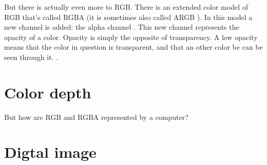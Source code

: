 But there is actually even more to RGB. There is an extended color
model of RGB that's called RGBA (it is sometimes also
called ARGB ). In this model a new channel is added: the
alpha channel . This new channel represents the
opacity of a color. Opacity is simply the opposite of transparency.  A
low opacity means that the color in question is transparent,
 and that an other color be can be seen
through it.  \cite{porter84_compos_dig_img}.

\section{Color depth}
\label{sec:bit-depth}

But how are RGB and RGBA represented by a computer?

\section{Digtal image}
\label{sec:digtal-image}


\printbibliography[heading=subbibliography]